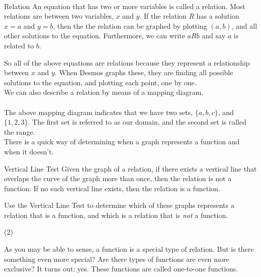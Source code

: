 \documentclass[12pt,fleqn]{book}
\begin{document}
\\[1em]
\begin{defn}{Relation}{}
    An equation that has two or more variables is called a relation.  Most relations are between two variables, $x$ and $y$.  If the relation $R$ has a solution $x=a$ and $y=b$, then the the relation can be graphed by plotting $(a,b)$, and all other solutions to the equation.  Furthermore, we can write $a R b$ and say $a$ is related to $b$.
\end{defn}
So all of the above equations are relations because they represent a relationship between $x$ and $y$.  When Desmos graphs these, they are finding all possible solutions to the equation, and plotting each point, one by one.
\\[1em]
We can also describe a relation by means of a mapping diagram.
\\[1em]
\\[1em]
The above mapping diagram indicates that we have two sets, $\{a, b, c\}$, and $\{1, 2, 3\}$.
The first set is referred to as our domain, and the second set is called the range.
\\[1em]
There is a quick way of determining when a graph represents a function and when it doesn't.  
\begin{defn}{Vertical Line Test}{}
Given the graph of a relation, if there exists a vertical line that overlaps the curve of the graph more than once, then the relation is not a function.  If no such vertical line exists, then the relation is a function.
\end{defn}
Use the Vertical Line Test to determine which of these graphs represents a relation that is a function, and which is a relation that is \emph{not} a function.
\begin{tasks}(2)
\task {}
\task {}
\task {}
\task {}
\task {}
\task {}
\task {}
\task {}
\end{tasks}

As you may be able to sense, a function is a special type of relation.  But is there something even more special?  Are there types of functions are even more exclusive?  It turns out: yes.  These functions are called one-to-one functions.
\end{document}
